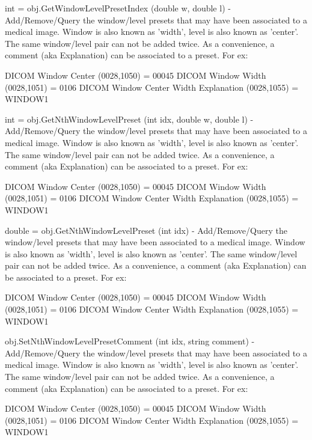 \begin{DoxyItemize}
\item {\ttfamily int = obj.\-Get\-Window\-Level\-Preset\-Index (double w, double l)} -\/ Add/\-Remove/\-Query the window/level presets that may have been associated to a medical image. Window is also known as 'width', level is also known as 'center'. The same window/level pair can not be added twice. As a convenience, a comment (aka Explanation) can be associated to a preset. For ex\-: \begin{DoxyVerb}         DICOM Window Center (0028,1050) = 00045
         DICOM Window Width  (0028,1051) = 0106
         DICOM Window Center Width Explanation (0028,1055) = WINDOW1\end{DoxyVerb}
  
\item {\ttfamily int = obj.\-Get\-Nth\-Window\-Level\-Preset (int idx, double w, double l)} -\/ Add/\-Remove/\-Query the window/level presets that may have been associated to a medical image. Window is also known as 'width', level is also known as 'center'. The same window/level pair can not be added twice. As a convenience, a comment (aka Explanation) can be associated to a preset. For ex\-: \begin{DoxyVerb}         DICOM Window Center (0028,1050) = 00045
         DICOM Window Width  (0028,1051) = 0106
         DICOM Window Center Width Explanation (0028,1055) = WINDOW1\end{DoxyVerb}
  
\item {\ttfamily double = obj.\-Get\-Nth\-Window\-Level\-Preset (int idx)} -\/ Add/\-Remove/\-Query the window/level presets that may have been associated to a medical image. Window is also known as 'width', level is also known as 'center'. The same window/level pair can not be added twice. As a convenience, a comment (aka Explanation) can be associated to a preset. For ex\-: \begin{DoxyVerb}         DICOM Window Center (0028,1050) = 00045
         DICOM Window Width  (0028,1051) = 0106
         DICOM Window Center Width Explanation (0028,1055) = WINDOW1\end{DoxyVerb}
  
\item {\ttfamily obj.\-Set\-Nth\-Window\-Level\-Preset\-Comment (int idx, string comment)} -\/ Add/\-Remove/\-Query the window/level presets that may have been associated to a medical image. Window is also known as 'width', level is also known as 'center'. The same window/level pair can not be added twice. As a convenience, a comment (aka Explanation) can be associated to a preset. For ex\-: \begin{DoxyVerb}         DICOM Window Center (0028,1050) = 00045
         DICOM Window Width  (0028,1051) = 0106
         DICOM Window Center Width Explanation (0028,1055) = WINDOW1\end{DoxyVerb}
  

\end{DoxyItemize}
